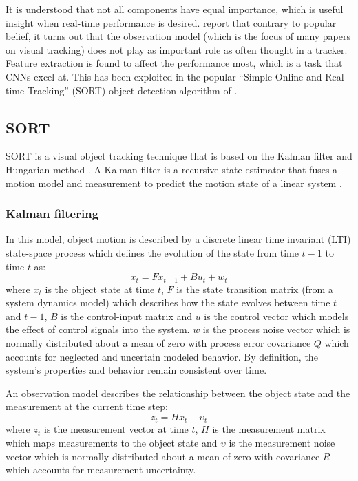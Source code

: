 \documentclass[a4paper,twoside,12pt]{report}
\begin{document}
It is understood that not all components have equal importance, which is useful insight when real-time performance is desired. \cite{diagnosingtrack} report that contrary to popular belief, it turns out that the observation model (which is the focus of many papers on visual tracking) does not play as important role as often thought in a tracker. Feature extraction is found to affect the performance most, which is a task that CNNs excel at. This has been exploited in the popular ``Simple Online and Real-time Tracking'' (SORT) object detection algorithm of \cite{sort}.

\subsection{SORT}

SORT is a visual object tracking technique that is based on the Kalman filter \citep{kalman} and Hungarian method \citep{hungarian}. A Kalman filter is a recursive state estimator that fuses a motion model and measurement to predict the motion state of a linear system \citep{trackbook}. 

\subsubsection{Kalman filtering}

In this model, object motion is described by a discrete linear time invariant (LTI) state-space process which defines the evolution of the state from time $t-1$ to time $t$ as:
\begin{equation} 
x_t=Fx_{t-1}+Bu_{t}+w_{t}
\end{equation}
where $x_{t}$ is the object state at time $t$, $F$ is the state transition matrix (from a system dynamics model) which describes how the state evolves between time $t$ and $t-1$, $B$ is the control-input matrix and $u$ is the control vector which models the effect of control signals into the system. $w$ is the process noise vector which is normally distributed about a mean of zero with process error covariance $Q$ which accounts for neglected and uncertain modeled behavior. By definition, the system's properties and behavior remain consistent over time.

An observation model describes the relationship between the object state and the measurement at the current time step:
\begin{equation} 
z_t=Hx_{t}+{\upsilon}_t
\end{equation}
where $z_{t}$ is the measurement vector at time $t$, $H$ is the measurement matrix which maps measurements to the object state and $\upsilon$ is the measurement noise vector which is normally distributed about a mean of zero with covariance $R$ which accounts for measurement uncertainty.
\end{document}
